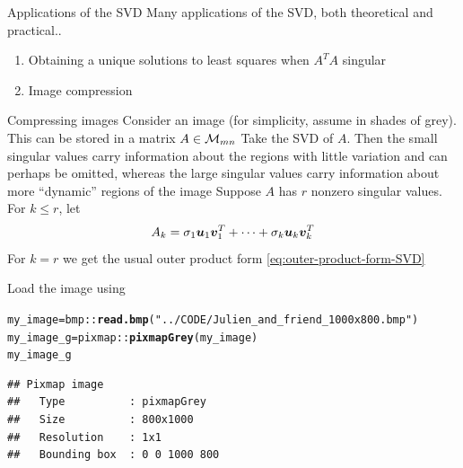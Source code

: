 \documentclass[aspectratio=169]{beamer}\usepackage[]{graphicx}\usepackage[]{xcolor}
\makeatletter
\newcommand{\hlsng}[1]{\textcolor[rgb]{0.192,0.494,0.8}{#1}}%
\newcommand{\hlopt}[1]{\textcolor[rgb]{0,0,0}{#1}}%
\newcommand{\hldef}[1]{\textcolor[rgb]{0.345,0.345,0.345}{#1}}%
\newcommand{\hlkwb}[1]{\textcolor[rgb]{0.69,0.353,0.396}{#1}}%
\newcommand{\hlkwd}[1]{\textcolor[rgb]{0.737,0.353,0.396}{\textbf{#1}}}%
\newenvironment{kframe}{%
 \def\at@end@of@kframe{}%
 \ifinner\ifhmode%
  \def\at@end@of@kframe{\end{minipage}}%
  \begin{minipage}{\columnwidth}%
 \fi\fi%
 \def\FrameCommand##1{\hskip\@totalleftmargin \hskip-\fboxsep
 \colorbox{shadecolor}{##1}\hskip-\fboxsep
     \hskip-\linewidth \hskip-\@totalleftmargin \hskip\columnwidth}%
 \MakeFramed {\advance\hsize-\width
   \@totalleftmargin\z@ \linewidth\hsize
   \@setminipage}}%
 {\par\unskip\endMakeFramed%
 \at@end@of@kframe}
\newenvironment{knitrout}{}{} %
\makeatother
\begin{document}
\begin{frame}{Applications of the SVD}
Many applications of the SVD, both theoretical and practical..
\vfill
\begin{enumerate}
\item Obtaining a unique solutions to least squares when $A^TA$ singular
\item Image compression
\end{enumerate}
\end{frame}



\begin{frame}{Compressing images}
Consider an image (for simplicity, assume in shades of grey). This can be stored in a matrix $A\in\mathcal{M}_{mn}$
\vfill
Take the SVD of $A$. Then the small singular values carry information about the regions with little variation and can perhaps be omitted, whereas the large singular values carry information about more ``dynamic'' regions of the image
\vfill
Suppose $A$  has $r$ nonzero singular values. For $k\leq r$, let
\[
A_k = \sigma_1\bm{u}_1\bm{v}_1^T+\cdots+\sigma_k\bm{u}_k\bm{v}_k^T
\]
\vfill
For $k=r$ we get the usual outer product form \eqref{eq:outer-product-form-SVD}
\end{frame}

\begin{frame}[fragile]
Load the image using 
\begin{knitrout}
\color{fgcolor}\begin{kframe}
\begin{alltt}
\hldef{my_image} \hlkwb{=} \hldef{bmp}\hlopt{::}\hlkwd{read.bmp}\hldef{(}\hlsng{"../CODE/Julien_and_friend_1000x800.bmp"}\hldef{)}
\hldef{my_image_g} \hlkwb{=} \hldef{pixmap}\hlopt{::}\hlkwd{pixmapGrey}\hldef{(my_image)}
\hldef{my_image_g}
\end{alltt}
\begin{verbatim}
## Pixmap image
##   Type          : pixmapGrey 
##   Size          : 800x1000 
##   Resolution    : 1x1 
##   Bounding box  : 0 0 1000 800
\end{verbatim}
\end{kframe}
\end{knitrout}
\end{frame}

\end{document}
